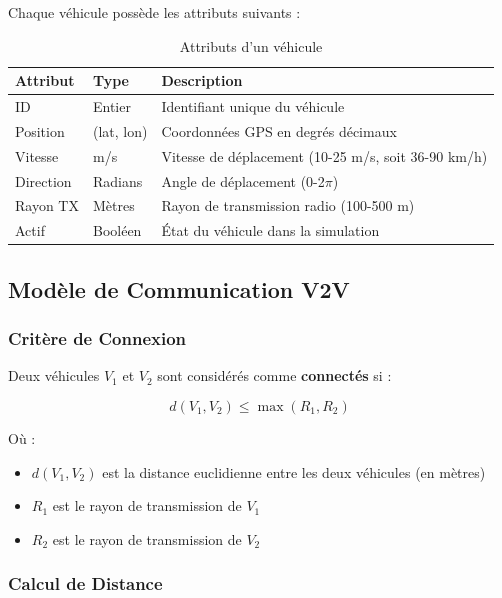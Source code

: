 \documentclass[12pt,a4paper]{article}
\begin{document}
Chaque véhicule possède les attributs suivants :

\begin{table}[H]
\centering
\begin{tabular}{llp{7cm}}
\toprule
\textbf{Attribut} & \textbf{Type} & \textbf{Description} \\
\midrule
ID & Entier & Identifiant unique du véhicule \\
Position & (lat, lon) & Coordonnées GPS en degrés décimaux \\
Vitesse & m/s & Vitesse de déplacement (10-25 m/s, soit 36-90 km/h) \\
Direction & Radians & Angle de déplacement (0-2$\pi$) \\
Rayon TX & Mètres & Rayon de transmission radio (100-500 m) \\
Actif & Booléen & État du véhicule dans la simulation \\
\bottomrule
\end{tabular}
\caption{Attributs d'un véhicule}
\end{table}

\subsection{Modèle de Communication V2V}

\subsubsection{Critère de Connexion}

Deux véhicules $V_1$ et $V_2$ sont considérés comme \textbf{connectés} si :

\begin{equation}
d(V_1, V_2) \leq \max(R_1, R_2)
\end{equation}

Où :
\begin{itemize}
    \item $d(V_1, V_2)$ est la distance euclidienne entre les deux véhicules (en mètres)
    \item $R_1$ est le rayon de transmission de $V_1$
    \item $R_2$ est le rayon de transmission de $V_2$
\end{itemize}

\subsubsection{Calcul de Distance}
\end{document}
